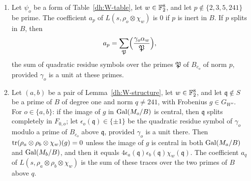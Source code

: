 \begin{lemma}\label{lv:coefficients}
\begin{enumerate}
\item[(a)] Let $\psi_o$ be a form of Table~\ref{dh:W-table}, let
 $w\in\mathbb F_2^8$, and let $p\notin\{2,3,5,241\}$ be prime. The coefficient
 $a_p$ of $L(s,\rho_o\otimes\chi_w)$ is $0$ if $p$ is inert in $B$. If $p$
 splits in $B$, then
 \[
  a_p=\sum_{\mathfrak P}\Bigl(\frac{\gamma_o\alpha_w}{\mathfrak P}\Bigr),
 \]
 the sum of quadratic residue symbols over the primes $\mathfrak P$ of
 $B_{c_o}$ of norm $p$, provided $\gamma_o$ is a unit at these primes.
\item[(b)] Let $(a,b)$ be a pair of Lemma~\ref{dh:W-structure}, let
 $w\in\mathbb F_2^8$, and let $\mathfrak q\notin S$ be a prime of $B$ of degree
 one and norm $q\ne241$, with Frobenius $g\in G_{W''}$. For $o\in\{a,b\}$: if
 the image of $g$ in $\operatorname{Gal}(M_o/B)$ is central, then $\mathfrak q$ splits completely in
 $F_{0,o}$; let $\epsilon_o(\mathfrak q)\in\{\pm1\}$ be the quadratic residue
 symbol of $\gamma_o$ modulo a prime of $B_{c_o}$ above $\mathfrak q$,
 provided $\gamma_o$ is a unit there. Then
 $\operatorname{tr}(\rho_a\otimes\rho_b\otimes\chi_w)(g)=0$ unless the image of $g$ is
 central in both $\operatorname{Gal}(M_a/B)$ and $\operatorname{Gal}(M_b/B)$, and then it equals
 $4\epsilon_a(\mathfrak q)\epsilon_b(\mathfrak q)\chi_w(\mathfrak q)$. The
 coefficient $a_q$ of $L(s,\rho_a\otimes\rho_b\otimes\chi_w)$ is the sum of
 these traces over the two primes of $B$ above $q$.
\end{enumerate}
\end{lemma}

